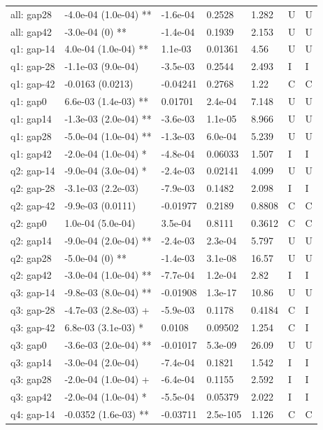 {\begin{longtable}{@{}p{.245\linewidth}p{.17\linewidth}p{.17\linewidth}p{.085\linewidth}p{.060\linewidth}p{.08\linewidth}p{.07\linewidth}@{}}
all: gap28 & -4.0e-04 (1.0e-04) ** & -1.6e-04 & 0.2528 & 1.282 & U & U\\
all: gap42 & -3.0e-04 (0) ** & -1.4e-04 & 0.1939 & 2.153 & U & U\\
q1: gap-14 & 4.0e-04 (1.0e-04) ** & 1.1e-03 & 0.01361 & 4.56 & U & U\\
q1: gap-28 & -1.1e-03 (9.0e-04) & -3.5e-03 & 0.2544 & 2.493 & I & I\\
q1: gap-42 & -0.0163 (0.0213) & -0.04241 & 0.2768 & 1.22 & C & C\\
q1: gap0 & 6.6e-03 (1.4e-03) ** & 0.01701 & 2.4e-04 & 7.148 & U & U\\
q1: gap14 & -1.3e-03 (2.0e-04) ** & -3.6e-03 & 1.1e-05 & 8.966 & U & U\\
q1: gap28 & -5.0e-04 (1.0e-04) ** & -1.3e-03 & 6.0e-04 & 5.239 & U & U\\
q1: gap42 & -2.0e-04 (1.0e-04) * & -4.8e-04 & 0.06033 & 1.507 & I & I\\
q2: gap-14 & -9.0e-04 (3.0e-04) * & -2.4e-03 & 0.02141 & 4.099 & U & U\\
q2: gap-28 & -3.1e-03 (2.2e-03) & -7.9e-03 & 0.1482 & 2.098 & I & I\\
q2: gap-42 & -9.9e-03 (0.0111) & -0.01977 & 0.2189 & 0.8808 & C & C\\
q2: gap0 & 1.0e-04 (5.0e-04) & 3.5e-04 & 0.8111 & 0.3612 & C & C\\
q2: gap14 & -9.0e-04 (2.0e-04) ** & -2.4e-03 & 2.3e-04 & 5.797 & U & U\\
q2: gap28 & -5.0e-04 (0) ** & -1.4e-03 & 3.1e-08 & 16.57 & U & U\\
q2: gap42 & -3.0e-04 (1.0e-04) ** & -7.7e-04 & 1.2e-04 & 2.82 & I & I\\
q3: gap-14 & -9.8e-03 (8.0e-04) ** & -0.01908 & 1.3e-17 & 10.86 & U & U\\
q3: gap-28 & -4.7e-03 (2.8e-03) + & -5.9e-03 & 0.1178 & 0.4184 & C & I\\
q3: gap-42 & 6.8e-03 (3.1e-03) * & 0.0108 & 0.09502 & 1.254 & C & I\\
q3: gap0 & -3.6e-03 (2.0e-04) ** & -0.01017 & 5.3e-09 & 26.09 & U & U\\
q3: gap14 & -3.0e-04 (2.0e-04) & -7.4e-04 & 0.1821 & 1.542 & I & I\\
q3: gap28 & -2.0e-04 (1.0e-04) + & -6.4e-04 & 0.1155 & 2.592 & I & I\\
q3: gap42 & -2.0e-04 (1.0e-04) * & -5.5e-04 & 0.05379 & 2.022 & I & I\\
q4: gap-14 & -0.0352 (1.6e-03) ** & -0.03711 & 2.5e-105 & 1.126 & C & C\\

\end{longtable}}
